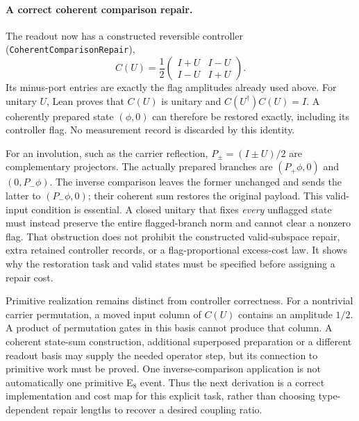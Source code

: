 \paragraph{A correct coherent comparison repair.} The readout now has a constructed reversible controller (\texttt{CoherentComparisonRepair}),
\begin{equation}
 C(U)=\frac12\begin{pmatrix}I+U&I-U\\ I-U&I+U\end{pmatrix}.
\end{equation}
Its minus-port entries are exactly the flag amplitudes already used above. For unitary $U$, Lean proves that $C(U)$ is unitary and $C(U^\dagger)C(U)=I$. A coherently prepared state $(\phi,0)$ can therefore be restored exactly, including its controller flag. No measurement record is discarded by this identity.

For an involution, such as the carrier reflection, $P_\pm=(I\pm U)/2$ are complementary projectors. The actually prepared branches are $(P_+\phi,0)$ and $(0,P_-\phi)$. The inverse comparison leaves the former unchanged and sends the latter to $(P_-\phi,0)$; their coherent sum restores the original payload. This valid-input condition is essential. A closed unitary that fixes \emph{every} unflagged state must instead preserve the entire flagged-branch norm and cannot clear a nonzero flag. That obstruction does not prohibit the constructed valid-subspace repair, extra retained controller records, or a flag-proportional excess-cost law. It shows why the restoration task and valid states must be specified before assigning a repair cost.

Primitive realization remains distinct from controller correctness. For a nontrivial carrier permutation, a moved input column of $C(U)$ contains an amplitude $1/2$. A product of permutation gates in this basis cannot produce that column. A coherent state-sum construction, additional superposed preparation or a different readout basis may supply the needed operator step, but its connection to primitive work must be proved. One inverse-comparison application is not automatically one primitive E$_8$ event. Thus the next derivation is a correct implementation and cost map for this explicit task, rather than choosing type-dependent repair lengths to recover a desired coupling ratio.

